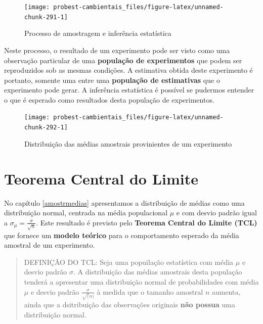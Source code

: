 \documentclass[
]{book}
\begin{document}
\begin{figure}

{\centering \texttt{[image: probest-cambientais\_files/figure-latex/unnamed-chunk-291-1]} 

}

\caption{Processo de amostragem e inferência estatística}\label{fig:unnamed-chunk-291}
\end{figure}

Neste processo, o resultado de um experimento pode ser visto como uma observação particular de uma \textbf{população de experimentos} que podem ser reproduzidos sob as mesmas condições. A estimativa obtida deste experimento é portanto, somente uma entre uma \textbf{população de estimativas} que o experimento pode gerar. A inferência estatística é possível se pudermos entender o que é esperado como resultados desta população de experimentos.

\begin{figure}

{\centering \texttt{[image: probest-cambientais\_files/figure-latex/unnamed-chunk-292-1]} 

}

\caption{Distribuição das médias amostrais provinientes de um experimento}\label{fig:unnamed-chunk-292}
\end{figure}

\hypertarget{teorema-central-do-limite}{%
\section{Teorema Central do Limite}\label{teorema-central-do-limite}}

No capítulo \ref{amostrmedias} apresentamos a distribuição de médias como uma distribuição normal, centrada na média populacional \(\mu\) e com desvio padrão igual a \(\sigma_{\mu} = \frac{\sigma}{\sqrt{n}}\). Este resultado é previsto pelo \textbf{Teorema Central do Limite (TCL)} que fornece um \textbf{modelo teórico} para o comportamento esperado da média amostral de um experimento.

\begin{quote}
DEFINIÇÃO DO TCL: Seja uma popuilação estatística com média \(\mu\) e desvio padrão \(\sigma\). A distribuição das médias amostrais desta população tenderá a apresentar uma distribuição normal de probabilidades com média \(\mu\) e desvio padrão \(\frac{\sigma}{\sqrt(n)}\) à medida que o tamanho amostral \(n\) aumenta, ainda que a dsitribuição das observações originais \textbf{não possua} uma distribuição normal.
\end{quote}
\end{document}
